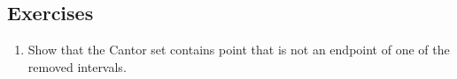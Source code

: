 \subsection{Exercises}

\begin{problem}
\begin{enumerate}
  \item Show that the Cantor set contains point that is not an endpoint of one of the removed intervals.
\end{enumerate}
\end{problem}
